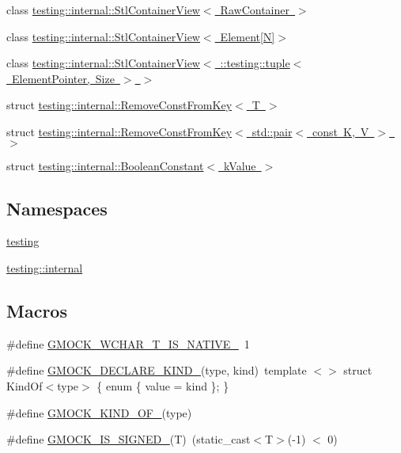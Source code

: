 \begin{DoxyCompactItemize}
\item 
class \mbox{\hyperlink{classtesting_1_1internal_1_1StlContainerView}{testing\+::internal\+::\+Stl\+Container\+View$<$ Raw\+Container $>$}}
\item 
class \mbox{\hyperlink{classtesting_1_1internal_1_1StlContainerView_3_01Element[N]_4}{testing\+::internal\+::\+Stl\+Container\+View$<$ Element\mbox{[}\+N\mbox{]}$>$}}
\item 
class \mbox{\hyperlink{classtesting_1_1internal_1_1StlContainerView_3_01_1_1testing_1_1tuple_3_01ElementPointer_00_01Size_01_4_01_4}{testing\+::internal\+::\+Stl\+Container\+View$<$ \+::testing\+::tuple$<$ Element\+Pointer, Size $>$ $>$}}
\item 
struct \mbox{\hyperlink{structtesting_1_1internal_1_1RemoveConstFromKey}{testing\+::internal\+::\+Remove\+Const\+From\+Key$<$ T $>$}}
\item 
struct \mbox{\hyperlink{structtesting_1_1internal_1_1RemoveConstFromKey_3_01std_1_1pair_3_01const_01K_00_01V_01_4_01_4}{testing\+::internal\+::\+Remove\+Const\+From\+Key$<$ std\+::pair$<$ const K, V $>$ $>$}}
\item 
struct \mbox{\hyperlink{structtesting_1_1internal_1_1BooleanConstant}{testing\+::internal\+::\+Boolean\+Constant$<$ k\+Value $>$}}
\end{DoxyCompactItemize}
\subsection*{Namespaces}
\begin{DoxyCompactItemize}
\item 
 \mbox{\hyperlink{namespacetesting}{testing}}
\item 
 \mbox{\hyperlink{namespacetesting_1_1internal}{testing\+::internal}}
\end{DoxyCompactItemize}
\subsection*{Macros}
\begin{DoxyCompactItemize}
\item 
\#define \mbox{\hyperlink{gmock-internal-utils_8h_a0725bd2b3326d282677e5197e53cc5e9}{G\+M\+O\+C\+K\+\_\+\+W\+C\+H\+A\+R\+\_\+\+T\+\_\+\+I\+S\+\_\+\+N\+A\+T\+I\+V\+E\+\_\+}}~1
\item 
\#define \mbox{\hyperlink{gmock-internal-utils_8h_a7d8a1871d7a30543a4e1882a8b2bbcd8}{G\+M\+O\+C\+K\+\_\+\+D\+E\+C\+L\+A\+R\+E\+\_\+\+K\+I\+N\+D\+\_\+}}(type,  kind)~template $<$$>$ struct Kind\+Of$<$type$>$ \{ enum \{ value = kind \}; \}
\item 
\#define \mbox{\hyperlink{gmock-internal-utils_8h_a72b01bdd08b78e927270885ca880ead4}{G\+M\+O\+C\+K\+\_\+\+K\+I\+N\+D\+\_\+\+O\+F\+\_\+}}(type)
\item 
\#define \mbox{\hyperlink{gmock-internal-utils_8h_a8ee49a1af821b48fd83849c050d0d5a2}{G\+M\+O\+C\+K\+\_\+\+I\+S\+\_\+\+S\+I\+G\+N\+E\+D\+\_\+}}(T)~(static\+\_\+cast$<$T$>$(-\/1) $<$ 0)
\end{DoxyCompactItemize}
